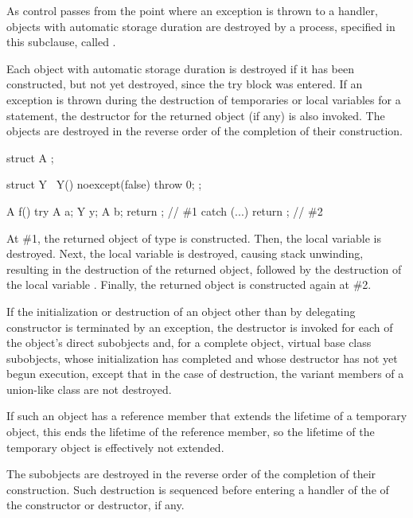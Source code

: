 \pnum
{}%
As control passes from the point where an exception is thrown
to a handler,
objects with automatic storage duration are destroyed by a process,
specified in this subclause, called .

\pnum
Each object with automatic storage duration is destroyed if it has been
constructed, but not yet destroyed,
since the try block was entered.
If an exception is thrown during the destruction of temporaries or
local variables for a  statement,
the destructor for the returned object (if any) is also invoked.
The objects are destroyed in the reverse order of the completion
of their construction.
\begin{example}
\begin{codeblock}
struct A { };

struct Y { ~Y() noexcept(false) { throw 0; } };

A f() {
  try {
    A a;
    Y y;
    A b;
    return {};      // \#1
  } catch (...) {
  }
  return {};        // \#2
}
\end{codeblock}
At \#1, the returned object of type  is constructed.
Then, the local variable  is destroyed.
Next, the local variable  is destroyed,
causing stack unwinding,
resulting in the destruction of the returned object,
followed by the destruction of the local variable .
Finally, the returned object is constructed again at \#2.
\end{example}

\pnum
If the initialization or destruction of an object
other than by delegating constructor
is terminated by an exception,
the destructor is invoked for
each of the object's direct subobjects
and, for a complete object, virtual base class subobjects,
whose initialization has completed
and whose destructor has not yet begun execution,
except that in the case of destruction, the variant members of a
union-like class are not destroyed.
\begin{note}
If such an object has a reference member
that extends the lifetime of a temporary object,
this ends the lifetime of the reference member,
so the lifetime of the temporary object is effectively not extended.
\end{note}
The subobjects are destroyed in the reverse order of the completion of
their construction. Such destruction is sequenced before entering a
handler of the  of the constructor or destructor,
if any.

